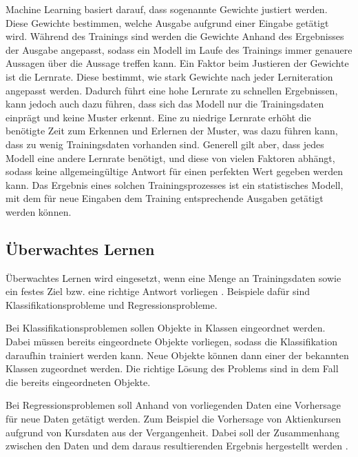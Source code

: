 Machine Learning basiert darauf, dass sogenannte Gewichte justiert werden. Diese Gewichte bestimmen, welche Ausgabe aufgrund einer Eingabe getätigt wird. Während des Trainings sind werden die Gewichte Anhand des Ergebnisses der Ausgabe angepasst, sodass ein Modell im Laufe des Trainings immer genauere Aussagen über die Aussage treffen kann. Ein Faktor beim Justieren der Gewichte ist die Lernrate. Diese bestimmt, wie stark Gewichte nach jeder Lerniteration angepasst werden. Dadurch führt eine hohe Lernrate zu schnellen Ergebnissen, kann jedoch auch dazu führen, dass sich das Modell nur die Trainingsdaten einprägt und keine Muster erkennt. Eine zu niedrige Lernrate erhöht die benötigte Zeit zum Erkennen und Erlernen der Muster, was dazu führen kann, dass zu wenig Trainingsdaten vorhanden sind. Generell gilt aber, dass jedes Modell eine andere Lernrate benötigt, und diese von vielen Faktoren abhängt, sodass keine allgemeingültige Antwort für einen perfekten Wert gegeben werden kann. Das Ergebnis eines solchen Trainingsprozesses ist ein statistisches Modell, mit dem für neue Eingaben dem Training entsprechende Ausgaben getätigt werden können.

\subsection{Überwachtes Lernen}
\label{subsec:ueberwachtesLernen}
Überwachtes Lernen wird eingesetzt, wenn eine Menge an Trainingsdaten sowie ein festes Ziel bzw. eine richtige Antwort vorliegen \cite[vgl.][]{ueberwachtMaschLernen}. Beispiele dafür sind Klassifikationsprobleme und Regressionsprobleme.

Bei Klassifikationsproblemen sollen Objekte in Klassen eingeordnet werden. Dabei müssen bereits eingeordnete Objekte vorliegen, sodass die Klassifikation daraufhin trainiert werden kann. Neue Objekte können dann einer der bekannten Klassen zugeordnet werden. Die richtige Lösung des Problems sind in dem Fall die bereits eingeordneten Objekte.

Bei Regressionsproblemen soll Anhand von vorliegenden Daten eine Vorhersage für neue Daten getätigt werden. Zum Beispiel die Vorhersage von Aktienkursen aufgrund von Kursdaten aus der Vergangenheit. Dabei soll der Zusammenhang zwischen den Daten und dem daraus resultierenden Ergebnis hergestellt werden \cite[vgl.][]{RegKlass}.

